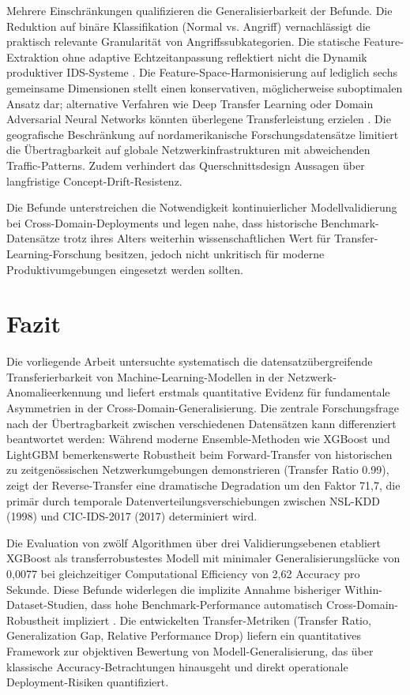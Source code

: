 \documentclass[11pt,a4paper]{article}
\begin{document}
    Mehrere Einschränkungen qualifizieren die Generalisierbarkeit der Befunde. Die Reduktion auf binäre Klassifikation (Normal vs. Angriff) vernachlässigt die praktisch relevante Granularität von Angriffssubkategorien. Die statische Feature-Extraktion ohne adaptive Echtzeitanpassung reflektiert nicht die Dynamik produktiver IDS-Systeme \parencite{Vinayakumar2019}. Die Feature-Space-Harmonisierung auf lediglich sechs gemeinsame Dimensionen stellt einen konservativen, möglicherweise suboptimalen Ansatz dar; alternative Verfahren wie Deep Transfer Learning oder Domain Adversarial Neural Networks könnten überlegene Transferleistung erzielen \parencite{Goodfellow2016}. Die geografische Beschränkung auf nordamerikanische Forschungsdatensätze limitiert die Übertragbarkeit auf globale Netzwerkinfrastrukturen mit abweichenden Traffic-Patterns. Zudem verhindert das Querschnittsdesign Aussagen über langfristige Concept-Drift-Resistenz.

    Die Befunde unterstreichen die Notwendigkeit kontinuierlicher Modellvalidierung bei Cross-Domain-Deployments und legen nahe, dass historische Benchmark-Datensätze trotz ihres Alters weiterhin wissenschaftlichen Wert für Transfer-Learning-Forschung besitzen, jedoch nicht unkritisch für moderne Produktivumgebungen eingesetzt werden sollten.

    \section{Fazit}

    Die vorliegende Arbeit untersuchte systematisch die datensatzübergreifende Transferierbarkeit von Machine-Learning-Modellen in der Netzwerk-Anomalieerkennung und liefert erstmals quantitative Evidenz für fundamentale Asymmetrien in der Cross-Domain-Generalisierung. Die zentrale Forschungsfrage nach der Übertragbarkeit zwischen verschiedenen Datensätzen kann differenziert beantwortet werden: Während moderne Ensemble-Methoden wie XGBoost und LightGBM bemerkenswerte Robustheit beim Forward-Transfer von historischen zu zeitgenössischen Netzwerkumgebungen demonstrieren (Transfer Ratio 0.99), zeigt der Reverse-Transfer eine dramatische Degradation um den Faktor 71,7, die primär durch temporale Datenverteilungsverschiebungen zwischen NSL-KDD (1998) und CIC-IDS-2017 (2017) determiniert wird.

    Die Evaluation von zwölf Algorithmen über drei Validierungsebenen etabliert XGBoost als transferrobustestes Modell mit minimaler Generalisierungslücke von 0,0077 bei gleichzeitiger Computational Efficiency von 2,62 Accuracy pro Sekunde. Diese Befunde widerlegen die implizite Annahme bisheriger Within-Dataset-Studien, dass hohe Benchmark-Performance automatisch Cross-Domain-Robustheit impliziert \parencite{Mourouzis2021}. Die entwickelten Transfer-Metriken (Transfer Ratio, Generalization Gap, Relative Performance Drop) liefern ein quantitatives Framework zur objektiven Bewertung von Modell-Generalisierung, das über klassische Accuracy-Betrachtungen hinausgeht und direkt operationale Deployment-Risiken quantifiziert.
\end{document}

